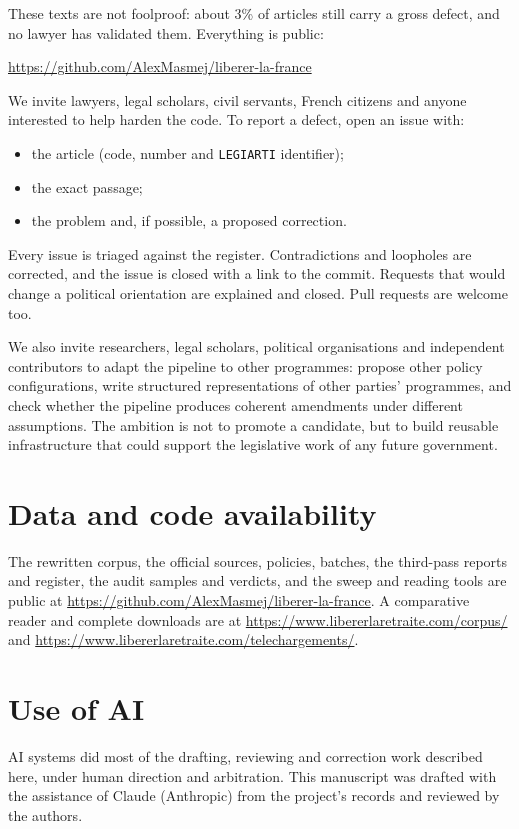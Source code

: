 \documentclass[11pt,a4paper]{article}
\begin{document}
These texts are not foolproof: about 3\% of articles still carry a gross defect, and no lawyer has validated them. Everything is public:
\begin{center}\url{https://github.com/AlexMasmej/liberer-la-france}\end{center}

We invite lawyers, legal scholars, civil servants, French citizens and anyone interested to help harden the code. To report a defect, open an issue with:
\begin{itemize}
  \item the article (code, number and \texttt{LEGIARTI} identifier);
  \item the exact passage;
  \item the problem and, if possible, a proposed correction.
\end{itemize}
Every issue is triaged against the register. Contradictions and loopholes are corrected, and the issue is closed with a link to the commit. Requests that would change a political orientation are explained and closed. Pull requests are welcome too.

We also invite researchers, legal scholars, political organisations and independent contributors to adapt the pipeline to other programmes: propose other policy configurations, write structured representations of other parties' programmes, and check whether the pipeline produces coherent amendments under different assumptions. The ambition is not to promote a candidate, but to build reusable infrastructure that could support the legislative work of any future government.

\section*{Data and code availability}

The rewritten corpus, the official sources, policies, batches, the third-pass reports and register, the audit samples and verdicts, and the sweep and reading tools are public at \url{https://github.com/AlexMasmej/liberer-la-france}. A comparative reader and complete downloads are at \url{https://www.libererlaretraite.com/corpus/} and \url{https://www.libererlaretraite.com/telechargements/}.

\section*{Use of AI}

AI systems did most of the drafting, reviewing and correction work described here, under human direction and arbitration. This manuscript was drafted with the assistance of Claude (Anthropic) from the project's records and reviewed by the authors.
\end{document}
